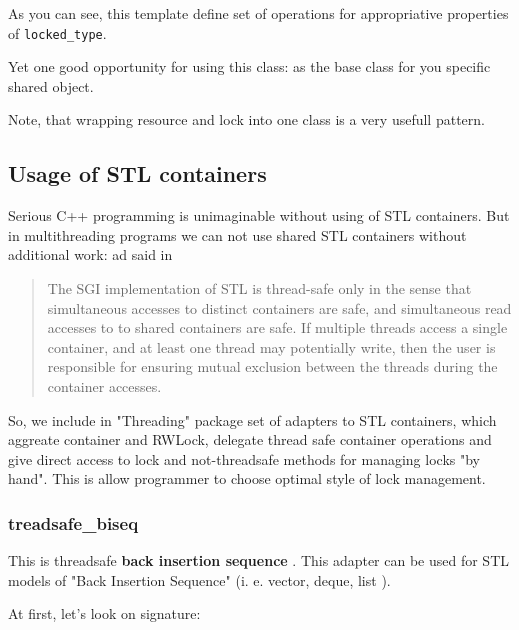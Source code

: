 \documentclass[10pt]{article}
\begin{document}
 As you can see, this template define set of operations for appropriative
properties of \verb|locked_type|.

 Yet one good opportunity for using this class: as the base class for you
 specific shared object.

 Note, that wrapping resource and lock into one class is a very usefull
 pattern.

\subsection{ Usage of STL containers } 

   Serious C++ programming is unimaginable without using of STL containers.
But in multithreading programs we can not use shared STL containers without
additional work: ad said in 
 \cite{SGI-STL}
\begin{quotation}
The SGI implementation of STL is thread-safe only in the sense that simultaneous accesses to distinct
containers are safe, and simultaneous read accesses to to shared containers are safe. If multiple threads
access a single container, and at least one thread may potentially write, then the user is responsible for
ensuring mutual exclusion between the threads during the container accesses. 
\end{quotation}

 So, we include in "Threading" package set of adapters to STL containers,
which aggreate container and RWLock, delegate thread safe container operations
and give direct access to lock and not-threadsafe methods for managing
locks "by hand". This is allow programmer to choose optimal style
of lock management.

\subsubsection{ treadsafe\_biseq }

 This is threadsafe {\bf back insertion sequence }. This adapter can be
used for STL models of "Back Insertion Sequence" (i. e. vector, deque, list ).

 At first, let's look on signature:
\end{document}
